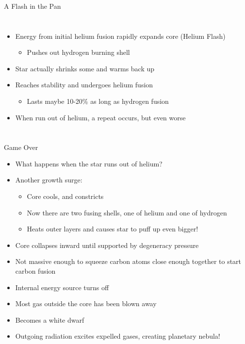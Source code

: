 \documentclass[pdf, aspectratio=169]{beamer}
\begin{document}
\begin{frame}{A Flash in the Pan}
  \begin{columns}
	\begin{itemize}
	  \item Energy from initial helium fusion rapidly expands core (Helium Flash)
		\begin{itemize}
		  \item Pushes out hydrogen burning shell
		\end{itemize}
	  \item<2-> Star actually shrinks some and warms back up
	  \item<3-> Reaches stability and undergoes helium fusion
		\begin{itemize}
		  \item Lasts maybe 10-20\% as long as hydrogen fusion
		\end{itemize}
	  \item<4-> When run out of helium, a repeat occurs, but even worse
	\end{itemize}
  \end{columns}
\end{frame}

\begin{frame}{Game Over}
  \begin{itemize}
	\item What happens when the star runs out of helium?
	\item Another growth surge:
	  \begin{itemize}
		\item Core cools, and constricts
		\item Now there are two fusing shells, one of helium and one of hydrogen
		\item Heats outer layers and causes star to puff up even bigger!
	  \end{itemize}
	\item Core collapses inward until supported by degeneracy pressure
	\item Not massive enough to squeeze carbon atoms close enough together to start carbon fusion
	\item Internal energy source turns off
	\item Most gas outside the core has been blown away
	\item Becomes a white dwarf
	\item Outgoing radiation excites expelled gases, creating planetary nebula!
  \end{itemize}
\end{frame}
\end{document}
